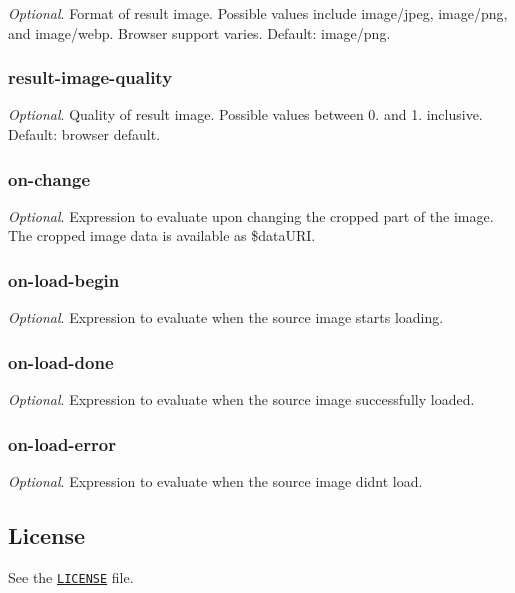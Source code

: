 {\itshape Optional}. Format of result image. Possible values include image/jpeg, image/png, and image/webp. Browser support varies. Default\+: image/png.

\subsubsection*{result-\/image-\/quality}

{\itshape Optional}. Quality of result image. Possible values between 0. and 1. inclusive. Default\+: browser default.

\subsubsection*{on-\/change}

{\itshape Optional}. Expression to evaluate upon changing the cropped part of the image. The cropped image data is available as \$data\+U\+RI.

\subsubsection*{on-\/load-\/begin}

{\itshape Optional}. Expression to evaluate when the source image starts loading.

\subsubsection*{on-\/load-\/done}

{\itshape Optional}. Expression to evaluate when the source image successfully loaded.

\subsubsection*{on-\/load-\/error}

{\itshape Optional}. Expression to evaluate when the source image didn\textquotesingle{}t load.

\subsection*{License}

See the \href{https://github.com/alexk111/ngImgCrop/blob/master/LICENSE}{\tt L\+I\+C\+E\+N\+SE} file. 